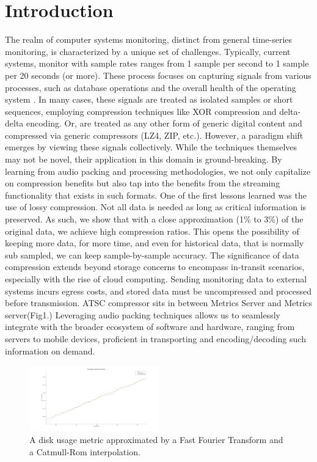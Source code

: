 \documentclass[conference]{IEEEtran}
\begin{document}
\section{Introduction}
The realm of computer systems monitoring, distinct from general time-series monitoring, is characterized by a unique set of challenges. 
Typically, current systems, monitor with sample rates ranges from 1 sample per second to 1 sample per 20 seconds (or more). 
These process focuses on capturing signals from various processes, such as database operations and the overall health of the operating system \cite{influx}. 
In many cases, these signals are treated as isolated samples or short sequences, employing compression techniques like XOR compression and delta-delta encoding. 
Or, are treated as any other form of generic digital content and compressed via generic compressors (LZ4, ZIP, etc.).
However, a paradigm shift emerges by viewing these signals collectively. 
While the techniques themselves may not be novel, their application in this domain is ground-breaking. 
By learning from audio packing and processing methodologies, we not only capitalize on compression benefits but also tap into the benefits from the streaming functionality that exists in such formats.
One of the first lessons learned was the use of lossy compression. 
Not all data is needed as long as critical information is preserved.
As such, we show that with a close approximation (1\% to 3\%) of the original data, we achieve high compression ratios. 
This opens the possibility of keeping more data, for more time, and even for historical data, that is normally sub sampled, we can keep sample-by-sample accuracy.
The significance of data compression extends beyond storage concerns to encompass in-transit scenarios, especially with the rise of cloud computing.
Sending monitoring data to external systems incurs egress costs, and stored data must be uncompressed and processed before transmission.
ATSC compressor sits in  between Metrics Server and Metrics server(Fig1.) Leveraging audio packing techniques allows us to seamlessly integrate with the broader ecosystem of software and hardware, ranging from servers to mobile devices, proficient in transporting and encoding/decoding such information on demand. 

\begin{figure}[ht]
  \centering
  \includegraphics[width=0.5\textwidth]{math_approximation.png}
  \caption{A disk usage metric approximated by a Fast Fourier Transform and a Catmull-Rom interpolation.}
  \label{Fig.1}
\end{figure}
\end{document}
